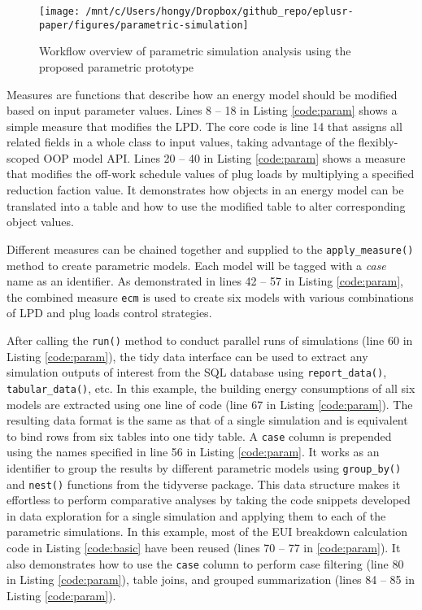 \documentclass[3p, times]{elsarticle} %
\begin{document}
\begin{figure}[!htb]
\texttt{[image: /mnt/c/Users/hongy/Dropbox/github\_repo/eplusr-paper/figures/parametric-simulation]} \caption{Workflow overview of parametric simulation analysis using the proposed parametric prototype}\label{fig:flow-param}
\end{figure}

Measures are functions that describe how an energy model should be modified
based on input parameter values. Lines 8 -- 18 in Listing \ref{code:param}
shows a simple measure that modifies the LPD. The core code is line 14 that
assigns all related fields in a whole class to input values, taking advantage of
the flexibly-scoped OOP model API. Lines 20 -- 40 in Listing \ref{code:param}
shows a measure that modifies the off-work schedule values of plug loads by
multiplying a specified reduction faction value. It demonstrates how objects in
an energy model can be translated into a table and how to use the modified table
to alter corresponding object values.

Different measures can be chained together and supplied to the \texttt{apply\_measure()}
method to create parametric models. Each model will be tagged with a \emph{case} name
as an identifier. As demonstrated in lines 42 -- 57 in Listing
\ref{code:param}, the combined measure \texttt{ecm} is used to create six models with
various combinations of LPD and plug loads control strategies.

After calling the \texttt{run()} method to conduct parallel runs of simulations (line
60 in Listing \ref{code:param}), the tidy data interface can be used to extract
any simulation outputs of interest from the SQL database using \texttt{report\_data()},
\texttt{tabular\_data()}, etc. In this example, the building energy consumptions of all
six models are extracted using one line of code (line 67 in Listing
\ref{code:param}). The resulting data format is the same as that of a single
simulation and is equivalent to bind rows from six tables into one tidy table. A
\texttt{case} column is prepended using the names specified in line 56 in Listing
\ref{code:param}. It works as an identifier to group the results by different
parametric models using \texttt{group\_by()} and \texttt{nest()} functions from the tidyverse
package. This data structure makes it effortless to perform comparative analyses
by taking the code snippets developed in data exploration for a single
simulation and applying them to each of the parametric simulations. In this
example, most of the EUI breakdown calculation code in Listing \ref{code:basic}
have been reused (lines 70 -- 77 in \ref{code:param}). It also demonstrates how
to use the \texttt{case} column to perform case filtering (line 80 in Listing
\ref{code:param}), table joins, and grouped summarization (lines 84 -- 85 in
Listing \ref{code:param}).
\end{document}
